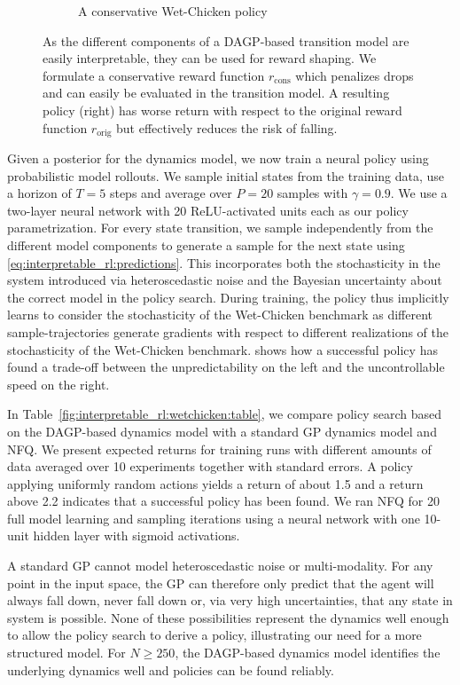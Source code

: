 \begin{figure}[tp]
\begin{subfigure}[b]{\linewidth}
        \caption{
            \label{fig:interpretable_rl:wetchicken:conservative_policy}
            A conservative Wet-Chicken policy
        }
    \end{subfigure}
    \caption{
        \label{fig:interpretable_rl:conservative_wetchicken_policy}
        As the different components of a DAGP-based transition model are easily interpretable, they can be used for reward shaping.
        We formulate a conservative reward function $r_\text{cons}$ which penalizes drops and can easily be evaluated in the transition model.
        A resulting policy (right) has worse return with respect to the original reward function $r_\text{orig}$ but effectively reduces the risk of falling.
    }
\end{figure}
Given a posterior for the dynamics model, we now train a neural policy using probabilistic model rollouts.
We sample initial states from the training data, use a horizon of $T = 5$ steps and average over $P = 20$ samples with $\gamma = 0.9$.
We use a two-layer neural network with 20 ReLU-activated units each as our policy parametrization.
For every state transition, we sample independently from the different model components to generate a sample for the next state using \cref{eq:interpretable_rl:predictions}.
This incorporates both the stochasticity in the system introduced via heteroscedastic noise and the Bayesian uncertainty about the correct model in the policy search.
During training, the policy thus implicitly learns to consider the stochasticity of the Wet-Chicken benchmark as different sample-trajectories generate gradients with respect to different realizations of the stochasticity of the Wet-Chicken benchmark.
 shows how a successful policy has found a trade-off between the unpredictability on the left and the uncontrollable speed on the right.

In Table~\ref{fig:interpretable_rl:wetchicken:table}, we compare policy search based on the DAGP-based dynamics model with a standard GP dynamics model and NFQ.
We present expected returns for training runs with different amounts of data averaged over 10 experiments together with standard errors.
A policy applying uniformly random actions yields a return of about \num{1.5} and a return above \num{2.2} indicates that a successful policy has been found.
We ran NFQ for 20 full model learning and sampling iterations using a neural network with one 10-unit hidden layer with sigmoid activations.

A standard GP cannot model heteroscedastic noise or multi-modality.
For any point in the input space, the GP can therefore only predict that the agent will always fall down, never fall down or, via very high uncertainties, that any state in system is possible.
None of these possibilities represent the dynamics well enough to allow the policy search to derive a policy, illustrating our need for a more structured model.
For $N \geq 250$, the DAGP-based dynamics model identifies the underlying dynamics well and policies can be found reliably.

